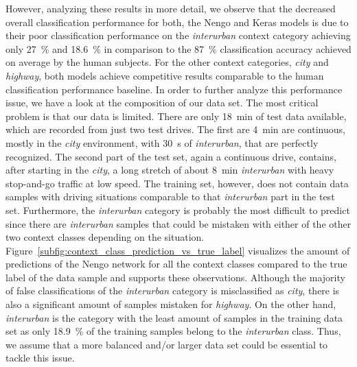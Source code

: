 However, analyzing these results in more detail, we observe that the decreased overall classification performance for both, the \ac{Nengo} and Keras models is due to their poor classification performance on the \emph{interurban} context category achieving only \SI{27}{\percent} and \SI{18.6}{\percent} in comparison to the \SI{87}{\percent} classification accuracy achieved on average by the human subjects.
For the other context categories, \emph{city} and \emph{highway}, both models achieve competitive results comparable to the human classification performance baseline.
In order to further analyze this performance issue, we have a look at the composition of our data set.
The most critical problem is that our data is limited.
There are only \SI{18}{\minute} of test data available, which are recorded from just two test drives.
The first are \SI{4}{\minute} are continuous, mostly in the \emph{city} environment, with \SI{30}{\second} of \emph{interurban}, that are perfectly recognized.
The second part of the test set, again a continuous drive, contains, after starting in the \emph{city}, a long stretch of about \SI{8}{\minute} \emph{interurban} with heavy stop-and-go traffic at low speed.
The training set, however, does not contain data samples with driving situations comparable to that \emph{interurban} part in the test set.
Furthermore, the \emph{interurban} category is probably the most difficult to predict since there are \emph{interurban} samples that could be mistaken with either of the other two context classes depending on the situation.
Figure~\ref{subfig:context_class_prediction_vs_true_label} visualizes the amount of predictions of the \ac{Nengo} network for all the context classes compared to the true label of the data sample and supports these observations.
Although the majority of false classifications of the \emph{interurban} category is misclassified as \emph{city}, there is also a significant amount of samples mistaken for \emph{highway}.
On the other hand, \emph{interurban} is the category with the least amount of samples in the training data set as only \SI{18.9}{\percent} of the training samples belong to the \emph{interurban} class.
Thus, we assume that a more balanced and/or larger data set could be essential to tackle this issue.

